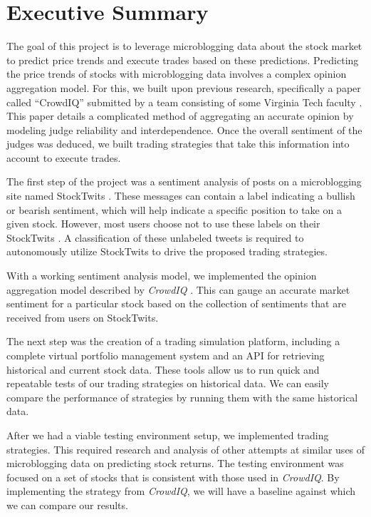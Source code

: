 
\section{Executive Summary}

The goal of this project is to leverage microblogging data about the stock market to predict price trends and execute trades based on these predictions.
Predicting the price trends of stocks with microblogging data involves a complex opinion aggregation model.
For this, we built upon previous research, specifically a paper called ``CrowdIQ'' submitted by a team consisting of some Virginia Tech faculty \cite{crowdiq}.
This paper details a complicated method of aggregating an accurate opinion by modeling judge reliability and interdependence.
Once the overall sentiment of the judges was deduced, we built trading strategies that take this information into account to execute trades.

The first step of the project was a sentiment analysis of posts on a microblogging site named StockTwits \cite{stocktwits}.
These messages can contain a label indicating a bullish or bearish sentiment, which will help indicate a specific position to take on a given stock.
However, most users choose not to use these labels on their StockTwits \cite{crowdiq}.
A classification of these unlabeled tweets is required to autonomously utilize StockTwits to drive the proposed trading strategies.

With a working sentiment analysis model, we implemented the opinion aggregation model described by \textit{CrowdIQ} \cite{crowdiq}.
This can gauge an accurate market sentiment for a particular stock based on the collection of sentiments that are received from users on StockTwits.

The next step was the creation of a trading simulation platform, including a complete virtual portfolio management system and an API for retrieving historical and current stock data.
These tools allow us to run quick and repeatable tests of our trading strategies on historical data.
We can easily compare the performance of strategies by running them with the same historical data.

After we had a viable testing environment setup, we implemented trading strategies.
This required research and analysis of other attempts at similar uses of microblogging data on predicting stock returns.
The testing environment was focused on a set of stocks that is consistent with those used in \textit{CrowdIQ}.
By implementing the strategy from \textit{CrowdIQ}, we will have a baseline against which we can compare our results.

